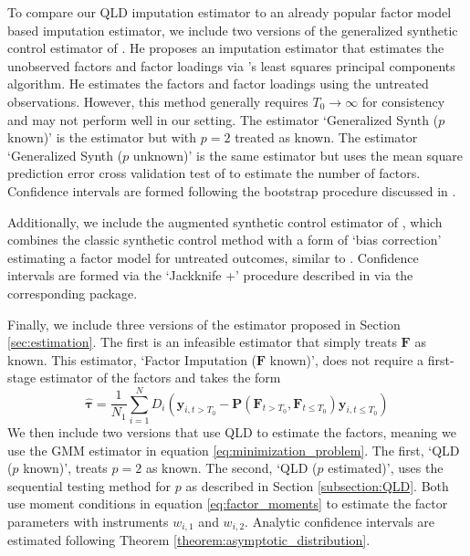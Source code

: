 \documentclass[12pt]{article}
\begin{document}
To compare our QLD imputation estimator to an already popular factor model based imputation estimator, we include two versions of the generalized synthetic control estimator of \citet{xu2017generalized}. He proposes an imputation estimator that estimates the unobserved factors and factor loadings via \citet{Bai_2009}'s least squares principal components algorithm. He estimates the factors and factor loadings using the untreated observations. However, this method generally requires $T_0 \rightarrow \infty$ for consistency and may not perform well in our setting. The estimator `Generalized Synth ($p$ known)' is the \citet{xu2017generalized} estimator but with $p = 2$ treated as known. The estimator `Generalized Synth ($p$ unknown)' is the same estimator but uses the mean square prediction error cross validation test of \citet{xu2017generalized} to estimate the number of factors. 
Confidence intervals are formed following the bootstrap procedure discussed in \citet{xu2017generalized}.

Additionally, we include the augmented synthetic control estimator of \citet{ben2021augmented}, which combines the classic synthetic control method with a form of `bias correction' estimating a factor model for untreated outcomes, similar to \citet{xu2017generalized}. 
Confidence intervals are formed via the `Jackknife +' procedure described in \citet{ben2021augmented} via the corresponding package.

Finally, we include three versions of the estimator proposed in Section \ref{sec:estimation}. The first is an infeasible estimator that simply treats $\bm F$ as known. This estimator, `Factor Imputation ($\bm F$ known)', does not require a first-stage estimator of the factors and takes the form
\begin{equation}
    \widehat{\bm \tau} = \frac{1}{N_1} \sum_{i = 1}^N D_i \left( \bm y_{i,t > T_0} - \bm P(\bm F_{t > T_0}, \bm F_{t \leq T_0}) \bm y_{i,t \leq T_0} \right)
\end{equation}
We then include two versions that use QLD to estimate the factors, meaning we use the GMM estimator in equation \eqref{eq:minimization_problem}. The first, `QLD ($p$ known)', treats $p = 2$ as known. The second, `QLD ($p$ estimated)', uses the sequential testing method for $p$ as described in Section \ref{subsection:QLD}. Both use moment conditions in equation \eqref{eq:factor_moments} to estimate the factor parameters with instruments $w_{i,1}$ and $w_{i,2}$.
Analytic confidence intervals are estimated following Theorem \ref{theorem:asymptotic_distribution}.
\end{document}
